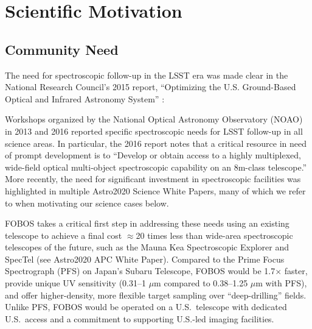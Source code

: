 
\vspace{-0.5cm}
\section{Scientific Motivation}

\subsection{Community Need} The need for spectroscopic follow-up in
the LSST era was made clear in the National Research Council's 2015
report, ``Optimizing the U.S. Ground-Based Optical and Infrared
Astronomy System'' \citep{NAP21722}:
%
\noindent{}

Workshops organized by the National Optical Astronomy Observatory
(NOAO) in 2013 and 2016 reported specific spectroscopic needs for
LSST follow-up in all science areas. In particular, the 2016 report
notes that a critical resource in need of prompt development is to
``Develop or obtain access to a highly multiplexed, wide-field
optical multi-object spectroscopic capability on an 8m-class
telescope.''  More recently, the need for significant investment in spectroscopic facilities was highlighted in multiple Astro2020 Science White Papers, many of which we refer to when motivating our science cases below.

FOBOS takes a critical first step in addressing these needs using an
existing telescope to achieve a final cost $\approx$20 times less
than wide-area spectroscopic telescopes of the future, such as the
Mauna Kea Spectroscopic Explorer \citep[MSE,][]{mse2018} and SpecTel
(see Astro2020 APC White Paper). Compared to the Prime Focus
Spectrograph (PFS) on Japan's Subaru Telescope, FOBOS would be
1.7$\times$ faster, provide unique UV sensitivity (0.31--1 $\mu$m
compared to 0.38--1.25 $\mu$m with PFS), and offer higher-density,
more flexible target sampling over ``deep-drilling'' fields. Unlike
PFS, FOBOS would be operated on a U.S.\ telescope with dedicated
U.S.\ access and a commitment to supporting U.S.-led imaging
facilities.

